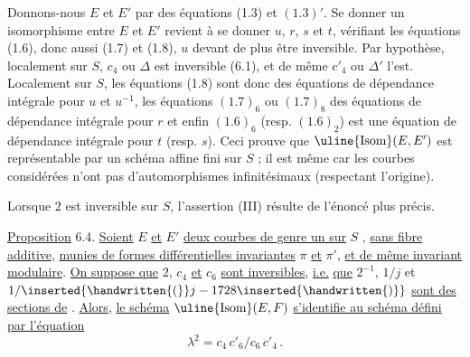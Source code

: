 Donnons-nous $E$ et $E'$ par des équations (1.3) et $(1.3)'$. Se donner un isomorphisme entre $E$ et $E'$ revient à se donner $u$, $r$, $s$ et $t$, vérifiant les équations (1.6), donc aussi (1.7) et (1.8), $u$ devant de plus être inversible. Par hypothèse, localement sur $S$, $c_4$ ou $\Delta$ est inversible (6.1), et de même $c'_4$ ou $\Delta'$ l'est. Localement sur $S$, les équations (1.8) sont donc des équations de dépendance intégrale pour $u$ et $u^{-1}$, les équations $(1.7)_6$ ou $(1.7)_8$ des équations de dépendance intégrale pour $r$ et enfin $(1.6)_6$ (resp. $(1.6)_2$) est une équation de dépendance intégrale pour $t$ (resp. $s$). Ceci prouve que $\text{\uline{Isom}}(E,E')$ est représentable par un schéma affine fini sur $S$ ; il est même  car les courbes considérées n'ont pas d'automorphismes infinitésimaux (respectant l'origine).

Lorsque $2$ est inversible sur $S$, l'assertion (III) résulte de l'énoncé plus précis.

\uline{Proposition} 6.4. \quad \uline{Soient} $E$ \uline{et} $E'$ \uline{deux courbes de genre un sur} $S$ ,%
%
\space
\uline{sans fibre additive}, \uline{munies de formes différentielles invariantes} $\pi$ \uline{et} $\pi'$, \uline{et de même invariant modulaire}. \uline{On suppose que} $2$, $c_4$ \uline{et} $c_6$ \uline{sont inversibles}, \uline{i.e.} \uline{que} $2^{-1}$, $1/j$ et $1/\inserted{\handwritten{(}}j-1728\inserted{\handwritten{)}}$ \uline{sont des sections de} \reversemarginpar{}\normalmarginpar. \uline{Alors}, \uline{le schéma} $\text{\uline{Isom}}(E,F)$ \uline{s'identifie au schéma défini par l'équation}
\[
\lambda^2=c_4\,c'_6/c_6\,c'_4 \, .
\]

